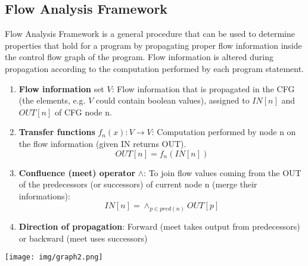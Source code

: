 \documentclass[a4paper, 10pt, titlepage]{article}
\begin{document}
\subsection{Flow Analysis Framework}
Flow Analysis Framework is a general procedure that can be used to determine properties that hold for a program by propagating proper flow information inside the control flow graph of the program. Flow information is altered during propagation according to the computation performed by each program statement. 
\begin{enumerate}
\item \textbf{Flow information} set $V$: Flow information that is propagated in the CFG (the elements, e.g. $V$ could contain boolean values), assigned to $IN[n]$ and $OUT[n]$ of CFG node n.
\item \textbf{Transfer functions} $f_n(x): V \rightarrow V$: Computation performed by node n on the flow information (given IN returns OUT). $$OUT[n]=f_n(IN[n])$$
\item \textbf{Confluence (meet) operator} $\wedge$: To join flow values coming from the OUT of the predecessors (or successors) of current node n (merge their informations):
$$IN[n]=\wedge_{p \in pred(n)} OUT[p]$$
\item \textbf{Direction of propagation}: Forward (meet takes output from predecessors) or backward (meet uses successors)
\end{enumerate}
\begin{center}
\texttt{[image: img/graph2.png]}
\end{center}
\end{document}

